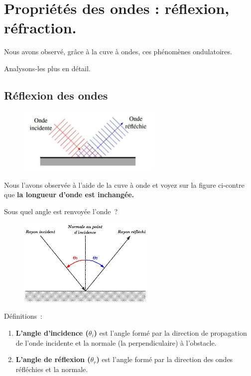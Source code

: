 \section{Propriétés des ondes : réflexion, réfraction. }

Nous avons observé, grâce à la cuve à ondes, ces phénomènes
ondulatoires.

Analysons-les plus en détail.

\subsection{Réflexion des ondes} %

\begin{figure}
\centering
\includegraphics[width=6.957cm,height=3.156cm]{Pictures/100000010000020F000000EF2B8E3664FF7463BF.png}
\caption{}
\end{figure}

Nous l'avons observée à l'aide de la cuve à onde et voyez sur la figure
ci-contre que \textbf{la longueur d'onde est inchangée.}

Sous quel angle est renvoyée l'onde~?

\begin{figure}
\centering
\includegraphics[width=6.548cm,height=4.193cm]{Pictures/10000001000001D10000012A74B1751A93498773.png}
\caption{}
\end{figure}

Définitions~: 
\begin{enumerate}
\item \textbf{L'angle d'incidence ($\theta_i$)} est l'angle formé par la direction
de propagation de l'onde incidente et la normale (la perpendiculaire) à
l'obstacle.
\item \textbf{L'angle de réflexion ($\theta_r$)} est l'angle formé par la direction
des ondes réfléchies et la normale.
\end{enumerate}

